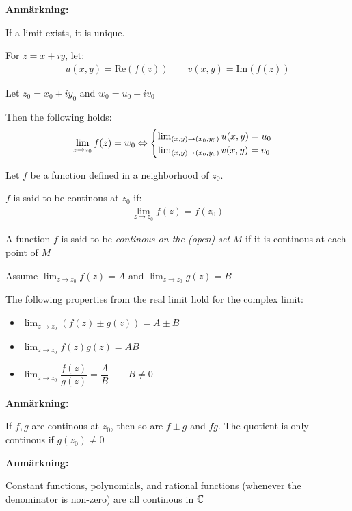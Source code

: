 \par\bigskip
\noindent\textbf{Anmärkning:}\par
\noindent If a limit exists, it is unique.
\par\bigskip
\begin{theo}[]{}
  For $z = x+iy$, let:
  \begin{equation*}
    \begin{gathered}
      u(x,y) = \text{Re}(f(z))\qquad v(x,y) = \text{Im}(f(z))
    \end{gathered}
  \end{equation*}
  \par\bigskip
  \noindent Let $z_0 = x_0+iy_0$ and $w_0 = u_0+iv_0$\par
  \noindent Then the following holds:
  \begin{equation*}
    \begin{gathered}
      \lim_{z\to z_0} f(z) = w_0\Leftrightarrow\begin{cases}\lim_{(x,y)\to(x_0,y_0)}u(x,y) = u_0\\\lim_{(x,y)\to(x_0,y_0)}v(x,y) = v_0\end{cases}
    \end{gathered}
  \end{equation*}
\end{theo}
\par\bigskip
\begin{theo}{}
  Let $f$ be a function defined in a neighborhood of $z_0$.
  \par\bigskip
  \noindent $f$ is said to be continous at $z_0$ if:
  \begin{equation*}
    \begin{gathered}
      \lim_{z\to z_0} f(z) = f(z_0)
    \end{gathered}
  \end{equation*}
  \par\bigskip
  \noindent A function $f$ is said to be \textit{continous on the (open) set} $M$ if it is continous at each point of $M$ 
\end{theo}
\newpage
\noindent Assume $\lim_{z\to z_0} f(z) = A$ and $\lim_{z\to z_0}g(z) = B$\par
\noindent The following properties from the real limit hold for the complex limit:\par
\begin{itemize}
  \item $\lim_{z\to z_0}(f(z)\pm g(z)) = A\pm B$
  \item $\lim_{z\to z_0} f(z)g(z) = AB$
  \item $\lim_{z\to z_0}\dfrac{f(z)}{g(z)} = \dfrac{A}{B}\qquad B\neq0$
\end{itemize}
\par\bigskip
\noindent\textbf{Anmärkning:}\par
\noindent If $f,g$ are continous at $z_0$, then so are $f\pm g$ and $fg$. The quotient is only continous if $g(z_0)\neq0$
\par\bigskip
\noindent\textbf{Anmärkning:}\par
\noindent Constant functions, polynomials, and rational functions (whenever the denominator is non-zero) are all continous in $\mathbb{C}$
\par\bigskip
